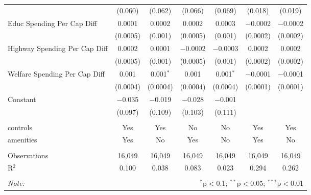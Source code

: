 \begin{table}[!htbp]
\begin{tabular}{@{\extracolsep{5pt}}lcccccc}
  & (0.060) & (0.062) & (0.066) & (0.069) & (0.018) & (0.019) \\ 
  Educ Spending Per Cap Diff & 0.0001 & 0.0002 & 0.0002 & 0.0003 & $-$0.0002 & $-$0.0002 \\ 
  & (0.0005) & (0.001) & (0.0005) & (0.001) & (0.0002) & (0.0002) \\ 
  Highway Spending Per Cap Diff & 0.0002 & 0.0001 & $-$0.0002 & $-$0.0003 & 0.0002 & 0.0002 \\ 
  & (0.0005) & (0.001) & (0.0005) & (0.001) & (0.0002) & (0.0002) \\ 
  Welfare Spending Per Cap Diff & 0.001 & 0.001$^{*}$ & 0.001 & 0.001$^{*}$ & $-$0.0001 & $-$0.0001 \\ 
  & (0.0004) & (0.0004) & (0.0004) & (0.0004) & (0.0001) & (0.0001) \\ 
  Constant & $-$0.035 & $-$0.019 & $-$0.028 & $-$0.001 &  &  \\ 
  & (0.097) & (0.109) & (0.103) & (0.111) &  &  \\ 
 \hline \\[-1.8ex] 
controls & Yes & Yes & No & No & Yes & Yes \\ 
amenities & Yes & No & Yes & No & Yes & No \\ 
\hline \\[-1.8ex] 
Observations & 16,049 & 16,049 & 16,049 & 16,049 & 16,049 & 16,049 \\ 
R$^{2}$ & 0.100 & 0.038 & 0.083 & 0.023 & 0.294 & 0.262 \\ 
\hline 
\hline \\[-1.8ex] 
\textit{Note:}  & \multicolumn{6}{r}{$^{*}$p$<$0.1; $^{**}$p$<$0.05; $^{***}$p$<$0.01} \\ 
\end{tabular} 
\end{table} 
